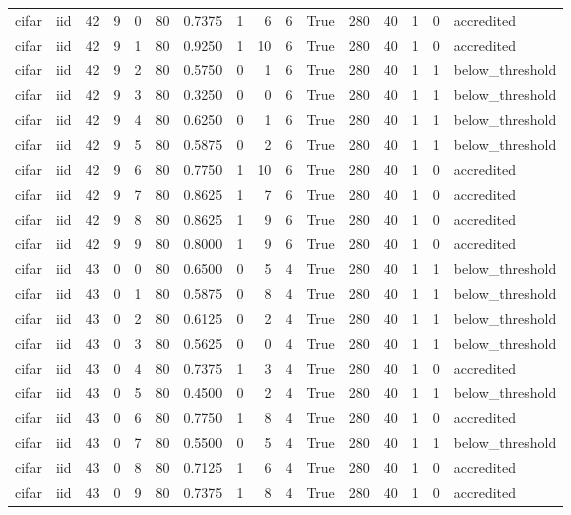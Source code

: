 \begin{tabular}{llrrrrrrrrrrrrrl}
cifar & iid & 42 & 9 & 0 & 80 & 0.7375 & 1 & 6 & 6 & True & 280 & 40 & 1 & 0 & accredited \\
cifar & iid & 42 & 9 & 1 & 80 & 0.9250 & 1 & 10 & 6 & True & 280 & 40 & 1 & 0 & accredited \\
cifar & iid & 42 & 9 & 2 & 80 & 0.5750 & 0 & 1 & 6 & True & 280 & 40 & 1 & 1 & below\_threshold \\
cifar & iid & 42 & 9 & 3 & 80 & 0.3250 & 0 & 0 & 6 & True & 280 & 40 & 1 & 1 & below\_threshold \\
cifar & iid & 42 & 9 & 4 & 80 & 0.6250 & 0 & 1 & 6 & True & 280 & 40 & 1 & 1 & below\_threshold \\
cifar & iid & 42 & 9 & 5 & 80 & 0.5875 & 0 & 2 & 6 & True & 280 & 40 & 1 & 1 & below\_threshold \\
cifar & iid & 42 & 9 & 6 & 80 & 0.7750 & 1 & 10 & 6 & True & 280 & 40 & 1 & 0 & accredited \\
cifar & iid & 42 & 9 & 7 & 80 & 0.8625 & 1 & 7 & 6 & True & 280 & 40 & 1 & 0 & accredited \\
cifar & iid & 42 & 9 & 8 & 80 & 0.8625 & 1 & 9 & 6 & True & 280 & 40 & 1 & 0 & accredited \\
cifar & iid & 42 & 9 & 9 & 80 & 0.8000 & 1 & 9 & 6 & True & 280 & 40 & 1 & 0 & accredited \\
cifar & iid & 43 & 0 & 0 & 80 & 0.6500 & 0 & 5 & 4 & True & 280 & 40 & 1 & 1 & below\_threshold \\
cifar & iid & 43 & 0 & 1 & 80 & 0.5875 & 0 & 8 & 4 & True & 280 & 40 & 1 & 1 & below\_threshold \\
cifar & iid & 43 & 0 & 2 & 80 & 0.6125 & 0 & 2 & 4 & True & 280 & 40 & 1 & 1 & below\_threshold \\
cifar & iid & 43 & 0 & 3 & 80 & 0.5625 & 0 & 0 & 4 & True & 280 & 40 & 1 & 1 & below\_threshold \\
cifar & iid & 43 & 0 & 4 & 80 & 0.7375 & 1 & 3 & 4 & True & 280 & 40 & 1 & 0 & accredited \\
cifar & iid & 43 & 0 & 5 & 80 & 0.4500 & 0 & 2 & 4 & True & 280 & 40 & 1 & 1 & below\_threshold \\
cifar & iid & 43 & 0 & 6 & 80 & 0.7750 & 1 & 8 & 4 & True & 280 & 40 & 1 & 0 & accredited \\
cifar & iid & 43 & 0 & 7 & 80 & 0.5500 & 0 & 5 & 4 & True & 280 & 40 & 1 & 1 & below\_threshold \\
cifar & iid & 43 & 0 & 8 & 80 & 0.7125 & 1 & 6 & 4 & True & 280 & 40 & 1 & 0 & accredited \\
cifar & iid & 43 & 0 & 9 & 80 & 0.7375 & 1 & 8 & 4 & True & 280 & 40 & 1 & 0 & accredited \\

\end{tabular}
